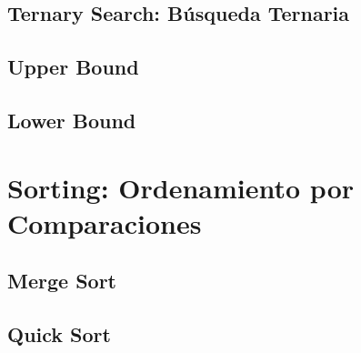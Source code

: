 \documentclass[12pt, fleqn]{report}                             %
\theoremstyle{break}                                            %
\begin{document}
        \section{Ternary Search: Búsqueda Ternaria}

        \section{Upper Bound}

        \section{Lower Bound}

    \clearpage
    \chapter{Sorting: Ordenamiento por Comparaciones}


        \section{Merge Sort}

        \section{Quick Sort}

\end{document}
